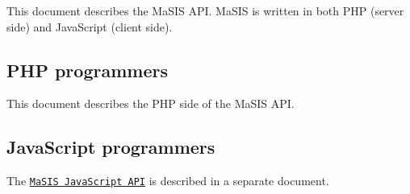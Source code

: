 This document describes the Ma\-S\-I\-S A\-P\-I. Ma\-S\-I\-S is written in both P\-H\-P (server side) and Java\-Script (client side).

\subsection*{P\-H\-P programmers}

This document describes the P\-H\-P side of the Ma\-S\-I\-S A\-P\-I.

\subsection*{Java\-Script programmers}

The \href{../masis.js/index.html}{\tt Ma\-S\-I\-S Java\-Script A\-P\-I} is described in a separate document. 